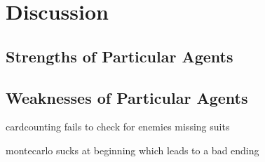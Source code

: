 
\section{Discussion}


\subsection{Strengths of Particular Agents}


\subsection{Weaknesses of Particular Agents}

cardcounting fails to check for enemies missing suits

montecarlo sucks at beginning which leads to a bad ending

